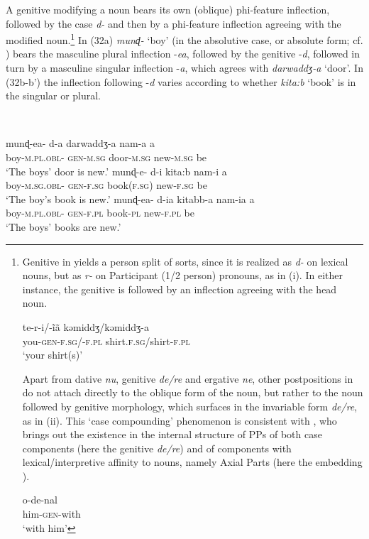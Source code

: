 \documentclass[output=paper]{langsci/langscibook}
\begin{document}
A genitive modifying a noun bears its own (oblique) phi-feature inflection, followed by the case  \textit{d-} and then by a phi-feature inflection agreeing with the modified noun.\footnote{Genitive in  yields a person split of sorts, since it is realized as \textit{d-} on lexical nouns, but as \textit{r-} on Participant (1\slash 2 person) pronouns, as in (i). In either instance, the genitive  is followed by an inflection agreeing with the head noun.

\ea \gll    te-r-i/-ĩã  kəmiddʒ/kəmiddʒ-a\\
            you-\textsc{gen-f.sg/-f.pl}
            shirt.\textsc{f.sg}/shirt-\textsc{f.pl}\\
    \glt    ‘your shirt(s)’
\z

Apart from dative \textit{nu}, genitive \textit{de\slash re} and ergative \textit{ne}, other postpositions in  do not attach directly to the oblique form of the noun, but rather to the noun followed by genitive morphology, which surfaces in the invariable form \textit{de\slash re}, as in (ii). This ‘case compounding’ phenomenon is consistent with \citet{Svenonius2006}, who brings out the existence in the internal structure of PPs of both case components (here the genitive \textit{de\slash re}) and of components with lexical\slash interpretive affinity to nouns, namely Axial Parts (here the embedding ).

\ea \gll    o-de-nal\\
            him-\textsc{gen}-with\\
    \glt    ‘with him’
\z
}
In (32a) \textit{munɖ-} ‘boy’ (in the absolutive case, or absolute form; cf. \citealt{Bailey1904}) bears the masculine plural inflection -\textit{ea}, followed by the genitive -\textit{d}, followed in turn by a masculine singular inflection -\textit{a}, which agrees with \textit{darwaddʒ-a} ‘door’. In (32b-b’) the inflection following -\textit{d} varies according to whether \textit{kita:b} ‘book’ is in the singular or plural. 

\ea%
    \label{ex:manzini:32}\\
    \begin{xlista}
    \ex
    \gll munɖ-ea-    d-a     darwaddʒ-a   nam-a   a\\
         boy-\textsc{m.pl.obl-}  \textsc{gen-m.sg}  door-\textsc{m.sg}  new-\textsc{m.sg}    be\\
    \glt ‘The boys’ door is new.’
    \ex  
    \gll munɖ-e-    d-i     kita:b     nam-i     a\\
         boy-\textsc{m.sg.obl-}  \textsc{gen-f.sg}   book(\textsc{f.sg)}   new-\textsc{f.sg}   be\\
    \glt ‘The boy’s book is new.’
    \gll munɖ-ea-    d-ia     kitabb-a   nam-ia   a\\
         boy-\textsc{m.pl.obl-}  \textsc{gen-f.pl}   book-\textsc{pl}   new-\textsc{f.pl}   be\\
    \glt ‘The boys’ books are new.’ 
    \end{xlista}
    \z
\end{document}
